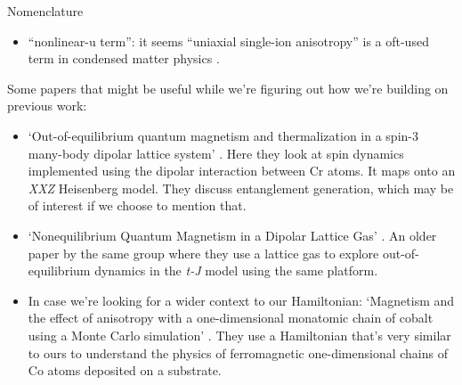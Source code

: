 \documentclass[aps,prl,twocolumn,superscriptaddress]{revtex4-1}
\begin{document}
Nomenclature
\begin{itemize}
    \item ``nonlinear-u term'': it seems ``uniaxial single-ion anisotropy'' is a oft-used term in condensed matter physics \cite{WANG20091904, He2007}.
\end{itemize}

Some papers that might be useful while we're figuring out how we're building on previous work:
\begin{itemize}
    \item `Out-of-equilibrium quantum magnetism and thermalization in a spin-3 many-body dipolar lattice system' \cite{Lepoutre2019}. Here they look at spin dynamics implemented using the dipolar interaction between Cr atoms. It maps onto an \emph{XXZ} Heisenberg model. They discuss entanglement generation, which may be of interest if we choose to mention that.
    
    \item `Nonequilibrium Quantum Magnetism in a Dipolar Lattice Gas' \cite{dePaz2013}. An older paper by the same group where they use a lattice gas to explore out-of-equilibrium dynamics in the \emph{t-J} model using the same platform.
    
    \item In case we're looking for a wider context to our Hamiltonian: `Magnetism and the effect of anisotropy with a one-dimensional monatomic chain of cobalt using a Monte Carlo simulation' \cite{He2007}. They use a Hamiltonian that's very similar to ours to understand the physics of ferromagnetic one-dimensional chains of Co atoms deposited on a substrate.
\end{itemize}

\end{document}
